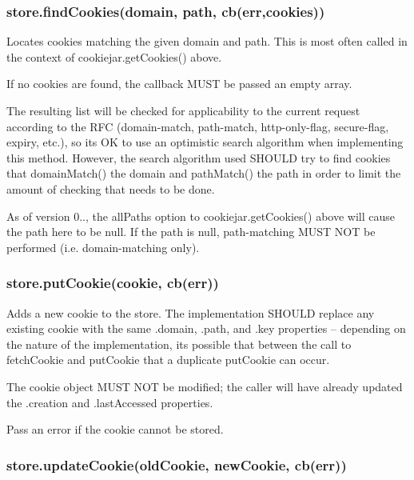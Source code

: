 \subsubsection*{{\ttfamily store.\+find\+Cookies(domain, path, cb(err,cookies))}}

Locates cookies matching the given domain and path. This is most often called in the context of {\ttfamily cookiejar.\+get\+Cookies()} above.

If no cookies are found, the callback M\+U\+ST be passed an empty array.

The resulting list will be checked for applicability to the current request according to the R\+FC (domain-\/match, path-\/match, http-\/only-\/flag, secure-\/flag, expiry, etc.), so it\textquotesingle{}s OK to use an optimistic search algorithm when implementing this method. However, the search algorithm used S\+H\+O\+U\+LD try to find cookies that {\ttfamily domain\+Match()} the domain and {\ttfamily path\+Match()} the path in order to limit the amount of checking that needs to be done.

As of version 0.., the {\ttfamily all\+Paths} option to {\ttfamily cookiejar.\+get\+Cookies()} above will cause the path here to be {\ttfamily null}. If the path is {\ttfamily null}, path-\/matching M\+U\+ST N\+OT be performed (i.\+e. domain-\/matching only).

\subsubsection*{{\ttfamily store.\+put\+Cookie(cookie, cb(err))}}

Adds a new cookie to the store. The implementation S\+H\+O\+U\+LD replace any existing cookie with the same {\ttfamily .domain}, {\ttfamily .path}, and {\ttfamily .key} properties -- depending on the nature of the implementation, it\textquotesingle{}s possible that between the call to {\ttfamily fetch\+Cookie} and {\ttfamily put\+Cookie} that a duplicate {\ttfamily put\+Cookie} can occur.

The {\ttfamily cookie} object M\+U\+ST N\+OT be modified; the caller will have already updated the {\ttfamily .creation} and {\ttfamily .last\+Accessed} properties.

Pass an error if the cookie cannot be stored.

\subsubsection*{{\ttfamily store.\+update\+Cookie(old\+Cookie, new\+Cookie, cb(err))}}

